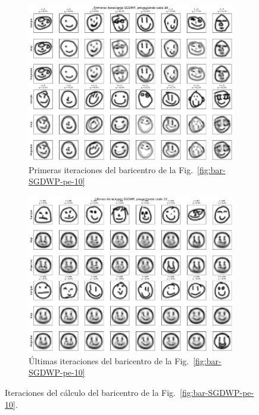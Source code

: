 \begin{figure}[htbp]
    \centering
    \begin{subfigure}[b]{0.8\textwidth}
        \centering
        \includegraphics[width=\textwidth]{img/sgdwp-pe-iters/first-iters-pe-10.pdf}
        \caption{Primeras iteraciones del baricentro de la Fig.~\ref{fig:bar-SGDWP-pe-10}}
        \label{fig:first-iters-pe-10}
    \end{subfigure}
    \begin{subfigure}[b]{0.8\textwidth}
        \centering
        \includegraphics[width=\textwidth]{img/sgdwp-pe-iters/last-iters-pe-10.pdf}
        \caption{Últimas iteraciones del baricentro de la Fig.~\ref{fig:bar-SGDWP-pe-10}}
        \label{fig:last-iters-pe-10}
    \end{subfigure}
    \caption{Iteraciones del cálculo del baricentro de la Fig.~\ref{fig:bar-SGDWP-pe-10}.}
    \label{fig:iters-pe-10}
\end{figure}